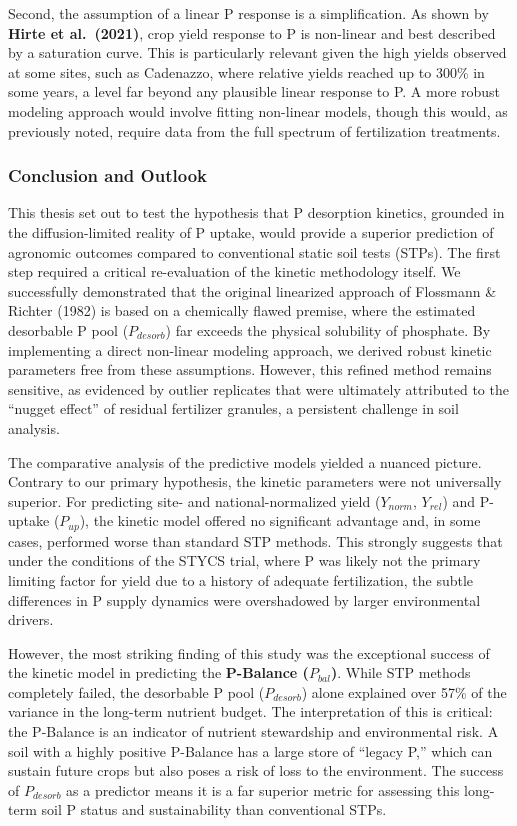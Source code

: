 \documentclass[
  a4paper,
]{article}
\begin{document}
Second, the assumption of a linear P response is a simplification. As
shown by \textbf{Hirte et al.~(2021)}, crop yield response to P is
non-linear and best described by a saturation curve. This is
particularly relevant given the high yields observed at some sites, such
as Cadenazzo, where relative yields reached up to 300\% in some years, a
level far beyond any plausible linear response to P. A more robust
modeling approach would involve fitting non-linear models, though this
would, as previously noted, require data from the full spectrum of
fertilization treatments.

\subsubsection{Conclusion and Outlook}\label{conclusion-and-outlook}

This thesis set out to test the hypothesis that P desorption kinetics,
grounded in the diffusion-limited reality of P uptake, would provide a
superior prediction of agronomic outcomes compared to conventional
static soil tests (STPs). The first step required a critical
re-evaluation of the kinetic methodology itself. We successfully
demonstrated that the original linearized approach of Flossmann \&
Richter (1982) is based on a chemically flawed premise, where the
estimated desorbable P pool (\(P_{desorb}\)) far exceeds the physical
solubility of phosphate. By implementing a direct non-linear modeling
approach, we derived robust kinetic parameters free from these
assumptions. However, this refined method remains sensitive, as
evidenced by outlier replicates that were ultimately attributed to the
``nugget effect'' of residual fertilizer granules, a persistent
challenge in soil analysis.

The comparative analysis of the predictive models yielded a nuanced
picture. Contrary to our primary hypothesis, the kinetic parameters were
not universally superior. For predicting site- and national-normalized
yield (\(Y_{norm}\), \(Y_{rel}\)) and P-uptake (\(P_{up}\)), the kinetic
model offered no significant advantage and, in some cases, performed
worse than standard STP methods. This strongly suggests that under the
conditions of the STYCS trial, where P was likely not the primary
limiting factor for yield due to a history of adequate fertilization,
the subtle differences in P supply dynamics were overshadowed by larger
environmental drivers.

However, the most striking finding of this study was the exceptional
success of the kinetic model in predicting the \textbf{P-Balance
(\(P_{bal}\))}. While STP methods completely failed, the desorbable P
pool (\(P_{desorb}\)) alone explained over 57\% of the variance in the
long-term nutrient budget. The interpretation of this is critical: the
P-Balance is an indicator of nutrient stewardship and environmental
risk. A soil with a highly positive P-Balance has a large store of
``legacy P,'' which can sustain future crops but also poses a risk of
loss to the environment. The success of \(P_{desorb}\) as a predictor
means it is a far superior metric for assessing this long-term soil P
status and sustainability than conventional STPs.
\end{document}

